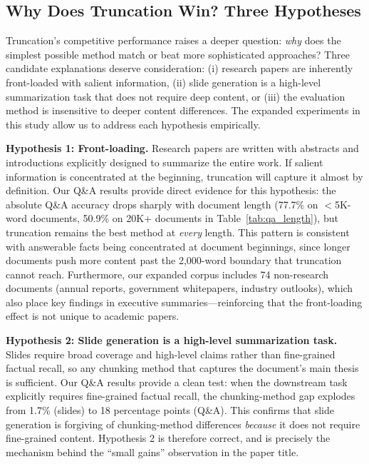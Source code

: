 \documentclass[journal]{IEEEtran}
\begin{document}
\subsection{Why Does Truncation Win? Three Hypotheses}
\label{sec:why-truncation}

Truncation's competitive performance raises a deeper question: \textit{why} does the simplest possible method match or beat more sophisticated approaches? Three candidate explanations deserve consideration: (i) research papers are inherently front-loaded with salient information, (ii) slide generation is a high-level summarization task that does not require deep content, or (iii) the evaluation method is insensitive to deeper content differences. The expanded experiments in this study allow us to address each hypothesis empirically.

\textbf{Hypothesis 1: Front-loading.} Research papers are written with abstracts and introductions explicitly designed to summarize the entire work. If salient information is concentrated at the beginning, truncation will capture it almost by definition. Our Q\&A results provide direct evidence for this hypothesis: the absolute Q\&A accuracy drops sharply with document length (77.7\% on $<$5K-word documents, 50.9\% on 20K+ documents in Table~\ref{tab:qa_length}), but truncation remains the best method at \textit{every} length. This pattern is consistent with answerable facts being concentrated at document beginnings, since longer documents push more content past the 2{,}000-word boundary that truncation cannot reach. Furthermore, our expanded corpus includes 74 non-research documents (annual reports, government whitepapers, industry outlooks), which also place key findings in executive summaries---reinforcing that the front-loading effect is not unique to academic papers.

\textbf{Hypothesis 2: Slide generation is a high-level summarization task.} Slides require broad coverage and high-level claims rather than fine-grained factual recall, so any chunking method that captures the document's main thesis is sufficient. Our Q\&A results provide a clean test: when the downstream task explicitly requires fine-grained factual recall, the chunking-method gap explodes from 1.7\% (slides) to 18 percentage points (Q\&A). This confirms that slide generation is forgiving of chunking-method differences \textit{because} it does not require fine-grained content. Hypothesis 2 is therefore correct, and is precisely the mechanism behind the ``small gains'' observation in the paper title.
\end{document}
